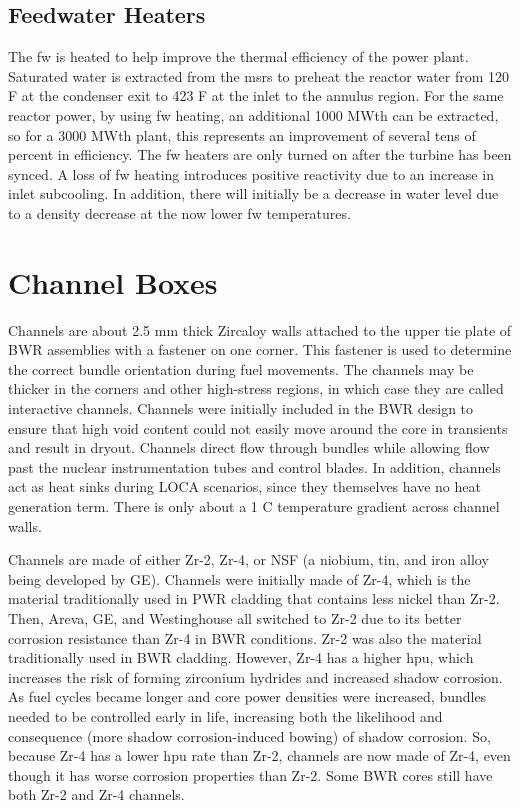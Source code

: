 \documentclass[10pt]{article}
\begin{document}
\subsection{Feedwater Heaters}
The \gls{fw} is heated to help improve the thermal efficiency of the power plant. Saturated water is extracted from the \gls{msr}s to preheat the reactor water from 120 F at the condenser exit to 423 F at the inlet to the annulus region. For the same reactor power, by using \gls{fw} heating, an additional 1000 MWth can be extracted, so for a 3000 MWth plant, this represents an improvement of several tens of percent in efficiency.  The \gls{fw} heaters are only turned on after the turbine has been synced. A loss of \gls{fw} heating introduces positive reactivity due to an increase in inlet subcooling. In addition, there will initially be a decrease in water level due to a density decrease at the now lower \gls{fw} temperatures.

 



\section{Channel Boxes}

Channels are about 2.5 mm thick Zircaloy walls attached to the upper tie plate of BWR assemblies with a fastener on one corner. This fastener is used to determine the correct bundle orientation during fuel movements. The channels may be thicker in the corners and other high-stress regions, in which case they are called interactive channels. Channels were initially included in the BWR design to ensure that high void content could not easily move around the core in transients and result in dryout. Channels direct flow through bundles while allowing flow past the nuclear instrumentation tubes and control blades. In addition, channels act as heat sinks during LOCA scenarios, since they themselves have no heat generation term. There is only about a 1 C temperature gradient across channel walls. 

Channels are made of either Zr-2, Zr-4, or NSF (a niobium, tin, and iron alloy being developed by GE). Channels were initially made of Zr-4, which is the material traditionally used in PWR cladding that contains less nickel than Zr-2. Then, Areva, GE, and Westinghouse all switched to Zr-2 due to its better corrosion resistance than Zr-4 in BWR conditions. Zr-2 was also the material traditionally used in BWR cladding. However, Zr-4 has a higher \gls{hpu}, which increases the risk of forming zirconium hydrides and increased shadow corrosion. As fuel cycles became longer and core power densities were increased, bundles needed to be controlled early in life, increasing both the likelihood and consequence (more shadow corrosion-induced bowing) of shadow corrosion. So, because Zr-4 has a lower \gls{hpu} rate than Zr-2, channels are now made of Zr-4, even though it has worse corrosion properties than Zr-2. Some BWR cores still have both Zr-2 and Zr-4 channels. 
\end{document}
